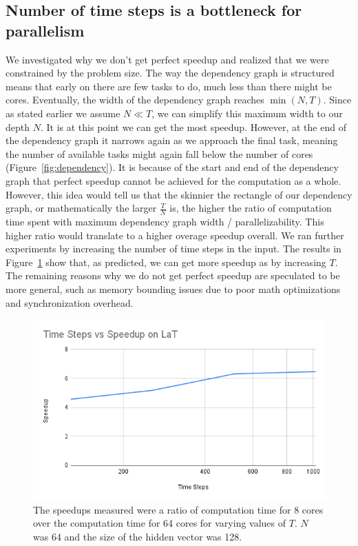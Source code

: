 \documentclass[12pt]{article}
\begin{document}
\subsection{Number of time steps is a bottleneck for parallelism}
We investigated why we don't get perfect speedup and realized that we were constrained by the problem size. The way the dependency graph is structured means that early on there are few tasks to do, much less than there might be cores. Eventually, the width of the dependency graph reaches $\min(N,T)$. Since as stated earlier we assume $N \ll T$, we can simplify this maximum width to our depth $N$. It is at this point we can get the most speedup. However, at the end of the dependency graph it narrows again as we approach the final task, meaning the number of available tasks might again fall below the number of cores (Figure~\ref{fig:dependency}). It is because of the start and end of the dependency graph that perfect speedup cannot be achieved for the computation as a whole. However, this idea would tell us that the skinnier the rectangle of our dependency graph, or mathematically the larger $\frac{T}{N}$ is, the higher the ratio of computation time spent with maximum dependency graph width / parallelizability. This higher ratio would translate to a higher overage speedup overall.
We ran further experiments by increasing the number of time steps in the input.
The results in Figure~\ref{fig:time_steps_versus_speedup} show that, as predicted, we can get more speedup as by increasing $T$.
The remaining reasons why we do not get perfect speedup are speculated to be more general, such as memory bounding issues due to poor math optimizations and synchronization overhead.

\begin{figure}
    \centering
    \includegraphics[width=12cm]{Time Steps vs Speedup on LaT.png}
    \caption{The speedups measured were a ratio of computation time for 8 cores over the computation time for 64 cores for varying values of $T$. $N$ was 64 and the size of the hidden vector was 128.}
    \label{fig:time_steps_versus_speedup}
\end{figure}
\end{document}
